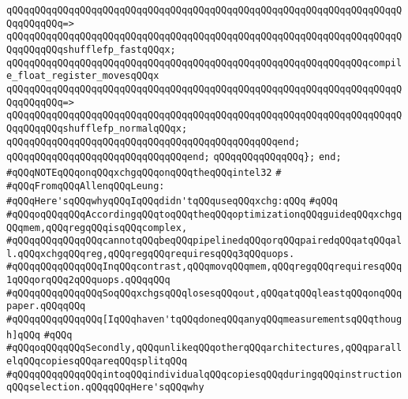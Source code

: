 \verb|qQQqqQQqqQQqqQQqqQQqqQQqqQQqqQQqqQQqqQQqqQQqqQQqqQQqqQQqqQQqqQQqqQQqqQQqqQQqqQQq=>|\newline
\verb|qQQqqQQqqQQqqQQqqQQqqQQqqQQqqQQqqQQqqQQqqQQqqQQqqQQqqQQqqQQqqQQqqQQqqQQqqQQqqQQqshufflefp_fastqQQqx;|\newline
\newline
\verb|qQQqqQQqqQQqqQQqqQQqqQQqqQQqqQQqqQQqqQQqqQQqqQQqqQQqqQQqqQQqqQQqcompile_float_register_movesqQQqx|\newline
\verb|qQQqqQQqqQQqqQQqqQQqqQQqqQQqqQQqqQQqqQQqqQQqqQQqqQQqqQQqqQQqqQQqqQQqqQQqqQQqqQQq=>|\newline
\verb|qQQqqQQqqQQqqQQqqQQqqQQqqQQqqQQqqQQqqQQqqQQqqQQqqQQqqQQqqQQqqQQqqQQqqQQqqQQqqQQqshufflefp_normalqQQqx;|\newline
\verb|qQQqqQQqqQQqqQQqqQQqqQQqqQQqqQQqqQQqqQQqqQQqqQQqend;|\newline
\verb|qQQqqQQqqQQqqQQqqQQqqQQqqQQqqQQqend;|\newline
\verb|qQQqqQQqqQQqqQQq};|\newline
\verb|end;|\newline
\newline
\verb|#qQQqNOTEqQQqonqQQqxchgqQQqonqQQqtheqQQqintel32|\newline
\verb|#|\newline
\verb|#qQQqFromqQQqAllenqQQqLeung:|\newline
\verb|#qQQqHere'sqQQqwhyqQQqIqQQqdidn'tqQQquseqQQqxchg:qQQq|\newline
\verb|#qQQq|\newline
\verb|#qQQqoqQQqqQQqAccordingqQQqtoqQQqtheqQQqoptimizationqQQqguideqQQqxchgqQQqmem,qQQqregqQQqisqQQqcomplex,|\newline
\verb|#qQQqqQQqqQQqqQQqcannotqQQqbeqQQqpipelinedqQQqorqQQqpairedqQQqatqQQqall.qQQqxchgqQQqreg,qQQqregqQQqrequiresqQQq3qQQquops.|\newline
\verb|#qQQqqQQqqQQqqQQqInqQQqcontrast,qQQqmovqQQqmem,qQQqregqQQqrequiresqQQq1qQQqorqQQq2qQQquops.qQQqqQQq|\newline
\verb|#qQQqqQQqqQQqqQQqSoqQQqxchgsqQQqlosesqQQqout,qQQqatqQQqleastqQQqonqQQqpaper.qQQqqQQq|\newline
\verb|#qQQqqQQqqQQqqQQq[IqQQqhaven'tqQQqdoneqQQqanyqQQqmeasurementsqQQqthough]qQQq|\newline
\verb|#qQQq|\newline
\verb|#qQQqoqQQqqQQqSecondly,qQQqunlikeqQQqotherqQQqarchitectures,qQQqparallelqQQqcopiesqQQqareqQQqsplitqQQq|\newline
\verb|#qQQqqQQqqQQqqQQqintoqQQqindividualqQQqcopiesqQQqduringqQQqinstructionqQQqselection.qQQqqQQqHere'sqQQqwhy|\newline
